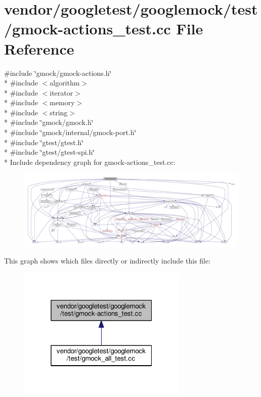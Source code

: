 \hypertarget{gmock-actions__test_8cc}{}\section{vendor/googletest/googlemock/test/gmock-\/actions\+\_\+test.cc File Reference}
\label{gmock-actions__test_8cc}
{\ttfamily \#include \char`\"{}gmock/gmock-\/actions.\+h\char`\"{}}\\*
{\ttfamily \#include $<$algorithm$>$}\\*
{\ttfamily \#include $<$iterator$>$}\\*
{\ttfamily \#include $<$memory$>$}\\*
{\ttfamily \#include $<$string$>$}\\*
{\ttfamily \#include \char`\"{}gmock/gmock.\+h\char`\"{}}\\*
{\ttfamily \#include \char`\"{}gmock/internal/gmock-\/port.\+h\char`\"{}}\\*
{\ttfamily \#include \char`\"{}gtest/gtest.\+h\char`\"{}}\\*
{\ttfamily \#include \char`\"{}gtest/gtest-\/spi.\+h\char`\"{}}\\*
Include dependency graph for gmock-\/actions\+\_\+test.cc\+:\nopagebreak
\begin{figure}[H]
\begin{center}
\leavevmode
\includegraphics[width=350pt]{gmock-actions__test_8cc__incl}
\end{center}
\end{figure}
This graph shows which files directly or indirectly include this file\+:\nopagebreak
\begin{figure}[H]
\begin{center}
\leavevmode
\includegraphics[width=229pt]{gmock-actions__test_8cc__dep__incl}
\end{center}
\end{figure}
